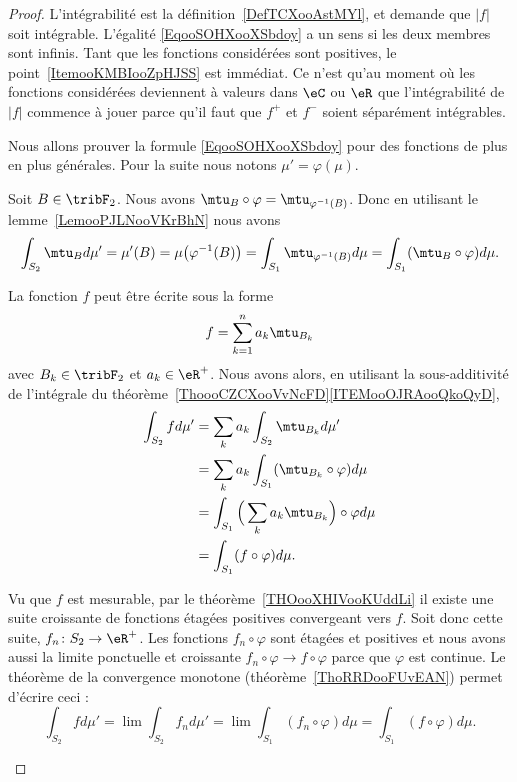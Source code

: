 \begin{proof}
	L'intégrabilité est la définition~\ref{DefTCXooAstMYl}, et demande que \( | f |\) soit intégrable. L'égalité \eqref{EqooSOHXooXSbdoy} a un sens si les deux membres sont infinis. Tant que les fonctions considérées sont positives, le point~\ref{ItemooKMBIooZpHJSS} est immédiat. Ce n'est qu'au moment où les fonctions considérées deviennent à valeurs dans \( \eC\) ou \( \eR\) que l'intégrabilité de \( | f |\) commence à jouer parce qu'il faut que \(  f^+  \) et \( f^-\) soient séparément intégrables.

	Nous allons prouver la formule \eqref{EqooSOHXooXSbdoy} pour des fonctions de plus en plus générales. Pour la suite nous notons \( \mu'=\varphi(\mu)\).

	\begin{subproof}
		\spitem[Pour \( f=\mtu_B\), \( B \) mesurable]
		Soit \( B\in\tribF_2 \). Nous avons \( \mtu_B\circ\varphi=\mtu_{\varphi^{-1}(B)}\). Donc en utilisant le lemme~\ref{LemooPJLNooVKrBhN} nous avons
		\begin{equation}
			\int_{S_2}\mtu_{B}d\mu'=\mu'(B)=\mu\big( \varphi^{-1}(B) \big)=\int_{S_1}\mtu_{\varphi^{-1}(B)}d\mu=\int_{S_1}(\mtu_B\circ \varphi)d\mu.
		\end{equation}

		La fonction \( f\) peut être écrite sous la forme
		\begin{equation}
			f=\sum_{k=1}^na_k\mtu_{B_k}
		\end{equation}
		avec \( B_k\in\tribF_2\) et \( a_k\in \eR^+\). Nous avons alors, en utilisant la sous-additivité de l'intégrale du théorème~\ref{ThoooCZCXooVvNcFD}\ref{ITEMooOJRAooQkoQyD},
		\begin{subequations}
			\begin{align}
				\int_{S_2}fd\mu' & =\sum_ka_k\int_{S_2}\mtu_{B_k}d\mu'                          \\
				                 & =\sum_ka_k\int_{S_1}(\mtu_{B_k}\circ\varphi)d\mu             \\
				                 & =\int_{S_1}\Big( \sum_ka_k\mtu_{B_k} \Big)\circ \varphi d\mu \\
				                 & =\int_{S_1}(f\circ\varphi)d\mu.
			\end{align}
		\end{subequations}

		Vu que \( f\) est mesurable, par le théorème~\ref{THOooXHIVooKUddLi} il existe une suite croissante de fonctions étagées positives convergeant vers \( f\). Soit donc cette suite, \( f_n\colon S_2\to \eR^+\). Les fonctions \( f_n\circ\varphi\) sont étagées et positives et nous avons aussi la limite ponctuelle et croissante \( f_n\circ\varphi\to f\circ\varphi\) parce que \( \varphi\) est continue. Le théorème de la convergence monotone (théorème~\ref{ThoRRDooFUvEAN}) permet d'écrire ceci :
		\begin{equation}
			\int_{S_2}fd\mu'=\lim\int_{S_2}f_nd\mu'= \lim\int_{S_1}(f_n\circ\varphi)d\mu=\int_{S_1}(f\circ\varphi)d\mu.
		\end{equation}


\end{subproof}
\end{proof}
